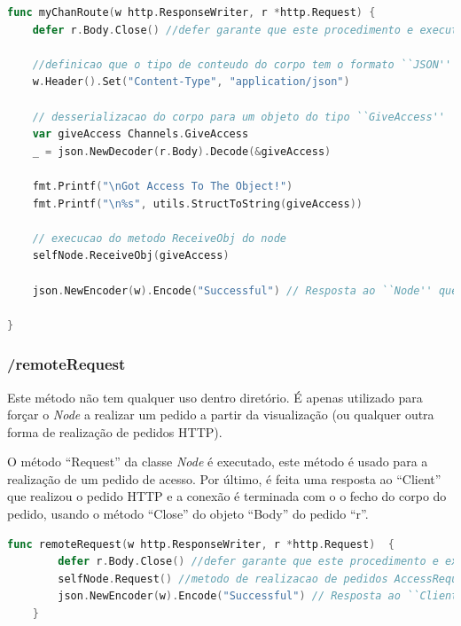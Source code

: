 \begin{lstlisting}[caption={\emph{Handler} ``myChanRoute'' do método ``/myChan''},language=Go]
func myChanRoute(w http.ResponseWriter, r *http.Request) {
	defer r.Body.Close() //defer garante que este procedimento e executado quando a execucao deste ``Handler'' termina

	//definicao que o tipo de conteudo do corpo tem o formato ``JSON''
	w.Header().Set("Content-Type", "application/json")

	// desserializacao do corpo para um objeto do tipo ``GiveAccess''
	var giveAccess Channels.GiveAccess
	_ = json.NewDecoder(r.Body).Decode(&giveAccess)

	fmt.Printf("\nGot Access To The Object!")
	fmt.Printf("\n%s", utils.StructToString(giveAccess))

	// execucao do metodo ReceiveObj do node
	selfNode.ReceiveObj(giveAccess)

	json.NewEncoder(w).Encode("Successful") // Resposta ao ``Node'' que realizou o pedido \acs{HTTP}

}

\end{lstlisting}

\subsubsection*{/remoteRequest}

Este método não tem qualquer uso dentro diretório.
É apenas utilizado para forçar o \emph{Node} a realizar um pedido a partir da visualização (ou qualquer outra forma de realização de pedidos \acs{HTTP}).

O método ``Request'' da classe \emph{Node} é executado, este método é usado para a realização de um pedido de acesso.
Por último, é feita uma resposta ao ``Client'' que realizou o pedido \acs{HTTP} e a conexão é terminada com 
o o fecho do corpo do pedido, usando o método ``Close'' do objeto ``Body'' do pedido ``r''.

\begin{lstlisting}[caption={\emph{Handler} ``remoteRequest'' do método ``/remoteRequest''},language=Go]
	func remoteRequest(w http.ResponseWriter, r *http.Request)  {
		defer r.Body.Close() //defer garante que este procedimento e executado quando a execucao deste ``Handler'' termina
		selfNode.Request() //metodo de realizacao de pedidos AccessRequest
		json.NewEncoder(w).Encode("Successful") // Resposta ao ``Client'' que realizou o pedido
	}
	

\end{lstlisting}

